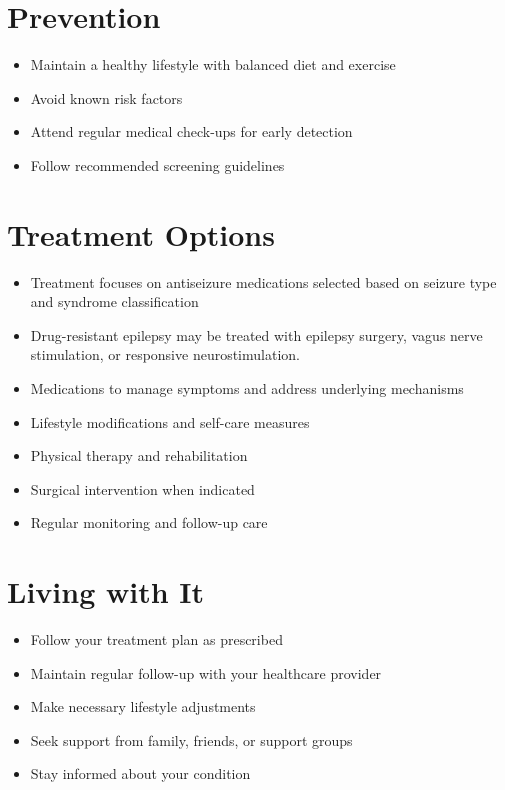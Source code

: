 \section{Prevention}
\begin{itemize}[noitemsep]
  \item Maintain a healthy lifestyle with balanced diet and exercise
  \item Avoid known risk factors
  \item Attend regular medical check-ups for early detection
  \item Follow recommended screening guidelines
\end{itemize}
\section{Treatment Options}
\begin{itemize}[noitemsep]
  \item Treatment focuses on antiseizure medications selected based on seizure type and syndrome classification
  \item Drug-resistant epilepsy may be treated with epilepsy surgery, vagus nerve stimulation, or responsive neurostimulation.
  \item Medications to manage symptoms and address underlying mechanisms
  \item Lifestyle modifications and self-care measures
  \item Physical therapy and rehabilitation
  \item Surgical intervention when indicated
  \item Regular monitoring and follow-up care
\end{itemize}
\section{Living with It}
\begin{itemize}[noitemsep]
  \item Follow your treatment plan as prescribed
  \item Maintain regular follow-up with your healthcare provider
  \item Make necessary lifestyle adjustments
  \item Seek support from family, friends, or support groups
  \item Stay informed about your condition
\end{itemize}
